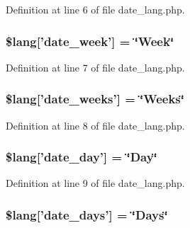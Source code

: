 Definition at line 6 of file date\-\_\-lang.\-php.

\hypertarget{date__lang_8php_a027a67b9a8e626d4a9b4080f8100ca53}{
\subsubsection[{\$lang}]{\setlength{\rightskip}{0pt plus 5cm}\$lang\mbox{[}'date\-\_\-week'\mbox{]} = \char`\"{}Week\char`\"{}}}\label{date__lang_8php_a027a67b9a8e626d4a9b4080f8100ca53}


Definition at line 7 of file date\-\_\-lang.\-php.

\hypertarget{date__lang_8php_af09796515b005d759204f911305a8459}{
\subsubsection[{\$lang}]{\setlength{\rightskip}{0pt plus 5cm}\$lang\mbox{[}'date\-\_\-weeks'\mbox{]} = \char`\"{}Weeks\char`\"{}}}\label{date__lang_8php_af09796515b005d759204f911305a8459}


Definition at line 8 of file date\-\_\-lang.\-php.

\hypertarget{date__lang_8php_ab414526293ffead872f9b90ed4fdd552}{
\subsubsection[{\$lang}]{\setlength{\rightskip}{0pt plus 5cm}\$lang\mbox{[}'date\-\_\-day'\mbox{]} = \char`\"{}Day\char`\"{}}}\label{date__lang_8php_ab414526293ffead872f9b90ed4fdd552}


Definition at line 9 of file date\-\_\-lang.\-php.

\hypertarget{date__lang_8php_abb37886fce0ac3f342d17f4132740870}{
\subsubsection[{\$lang}]{\setlength{\rightskip}{0pt plus 5cm}\$lang\mbox{[}'date\-\_\-days'\mbox{]} = \char`\"{}Days\char`\"{}}}\label{date__lang_8php_abb37886fce0ac3f342d17f4132740870}


